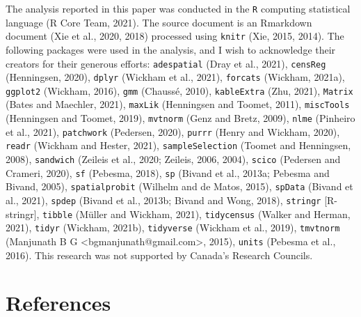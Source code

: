 \documentclass[]{elsarticle} %
\begin{document}
The analysis reported in this paper was conducted in the \texttt{R}
computing statistical language (R Core Team, 2021). The source document
is an Rmarkdown document (Xie et al., 2020, 2018) processed using
\texttt{knitr} (Xie, 2015, 2014). The following packages were used in
the analysis, and I wish to acknowledge their creators for their
generous efforts: \texttt{adespatial} (Dray et al., 2021),
\texttt{censReg} (Henningsen, 2020), \texttt{dplyr} (Wickham et al.,
2021), \texttt{forcats} (Wickham, 2021a), \texttt{ggplot2} (Wickham,
2016), \texttt{gmm} (Chaussé, 2010), \texttt{kableExtra} (Zhu, 2021),
\texttt{Matrix} (Bates and Maechler, 2021), \texttt{maxLik} (Henningsen
and Toomet, 2011), \texttt{miscTools} (Henningsen and Toomet, 2019),
\texttt{mvtnorm} (Genz and Bretz, 2009), \texttt{nlme} (Pinheiro et al.,
2021), \texttt{patchwork} (Pedersen, 2020), \texttt{purrr} (Henry and
Wickham, 2020), \texttt{readr} (Wickham and Hester, 2021),
\texttt{sampleSelection} (Toomet and Henningsen, 2008),
\texttt{sandwich} (Zeileis et al., 2020; Zeileis, 2006, 2004),
\texttt{scico} (Pedersen and Crameri, 2020), \texttt{sf} (Pebesma,
2018), \texttt{sp} (Bivand et al., 2013a; Pebesma and Bivand, 2005),
\texttt{spatialprobit} (Wilhelm and de Matos, 2015), \texttt{spData}
(Bivand et al., 2021), \texttt{spdep} (Bivand et al., 2013b; Bivand and
Wong, 2018), \texttt{stringr} {[}R-stringr{]}, \texttt{tibble} (Müller
and Wickham, 2021), \texttt{tidycensus} (Walker and Herman, 2021),
\texttt{tidyr} (Wickham, 2021b), \texttt{tidyverse} (Wickham et al.,
2019), \texttt{tmvtnorm} (Manjunath B G
\textless bgmanjunath@gmail.com\textgreater, 2015), \texttt{units}
(Pebesma et al., 2016). This research was not supported by Canada's
Research Councils.

\hypertarget{references}{%
\section*{References}\label{references}}
\end{document}
